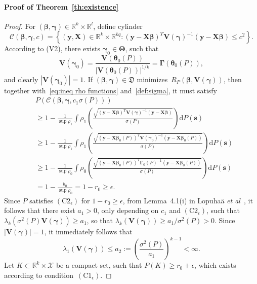 \documentclass{article}
\numberwithin{equation}{section}
\theoremstyle{plain}
\newcommand{\R}{\mathbb{R}}
\newcommand{\bbeta}{\bm\beta}
\newcommand{\btheta}{\bm\theta}
\newcommand{\bgamma}{\bm\gamma}
\newcommand{\bGamma}{\bm\Gamma}
\newcommand{\bTheta}{\bm\Theta}
\newcommand{\by}{\mathbf{y}}
\newcommand{\bs}{\mathbf{s}}
\newcommand{\bX}{\mathbf{X}}
\newcommand{\bV}{\mathbf{V}}
\begin{document}
\paragraph*{Proof of Theorem~\ref{th:existence}}
\begin{proof}
For $(\bbeta,\bgamma)\in\R^k\times\R^l$,
define cylinder
\begin{equation}
\label{def:cylinder gamma}
\mathcal{C}(\bbeta,\bgamma,c)=
\left\{
(\by,\bX)\in\R^k\times\R^{kq}:
(\by-\bX\bbeta)^T
\bV(\bgamma)^{-1}
(\by-\bX\bbeta)
\leq
c^2
\right\}.
\end{equation}
According to (V2), there exists $\bgamma_0\in\bTheta$, such that
\[
\bV(\bgamma_0)=\frac{\bV(\btheta_0(P))}{|\bV(\btheta_0(P))|^{1/k}}=\bGamma(\btheta_0(P)),
\]
and clearly $|\bV(\bgamma_0)|=1$.
If $(\bbeta,\bgamma)\in \mathfrak{D}$ minimizes~$R_P(\bbeta,\bV(\bgamma))$, then together with~\eqref{eq:ineq rho functions}
and~\eqref{def:sigma},
it must satisfy
\begin{equation}
\label{eq:lower bound prob cylinder}
\begin{split}
&
P\left(
\mathcal{C}\left(\bbeta,\bgamma,c_1\sigma(P)\right)
\right)\\
&\geq
1-\frac{1}{\sup\rho_1}
\int
\rho_1\left(
\frac{\displaystyle\sqrt{(\by-\bX\bbeta)^T\bV(\bgamma)^{-1}(\by-\bX\bbeta)}}{\sigma(P)}
\right)
\text{d}P(\bs)\\
&\geq
1-\frac{1}{\sup\rho_1}
\int
\rho_1\left(
\frac{\displaystyle\sqrt{(\by-\bX\bbeta_0(P))^T\bV(\bgamma_0)^{-1}(\by-\bX\bbeta_0(P))}}{\sigma(P)}
\right)
\text{d}P(\bs)\\
&\geq
1-\frac{1}{\sup\rho_0}
\int
\rho_0
\left(
\frac{\displaystyle\sqrt{(\by-\bX\bbeta_0(P))^T\bGamma_0(P)^{-1}(\by-\bX\bbeta_0(P))}}{\sigma(P)}
\right)
\text{d}P(\bs)\\
&=
1-\frac{b_0}{\sup\rho_0}
=
1-r_0
\geq
\epsilon.
\end{split}
\end{equation}
Since $P$ satisfies $(\text{C2}_\epsilon)$ for $1-r_0\geq \epsilon$, 
from Lemma~4.1(i) in Lopuha\"a \textit{et al}~\cite{lopuhaa-gares-ruizgazen2023}, 
it follows that there exist $a_1>0$, only depending on $c_1$ and $(\mathrm{C2}_{\epsilon})$, 
such that~$\lambda_k(\sigma^2(P)\bV(\bgamma))\geq a_1$, so that $\lambda_k(\bV(\bgamma))\geq a_1/\sigma^2(P)>0$.
Since $|\bV(\bgamma)|=1$, it immediately follows that
\[
\lambda_1(\bV(\bgamma))
\leq
a_2:=\left(\frac{\sigma^2(P)}{a_1}\right)^{k-1}<\infty.
\]
Let $K\subset\R^{k}\times \mathcal{X}$ be a compact set, such that $P(K)\geq r_0+\epsilon$, which exists according to condition~$(\mathrm{C1}_{\epsilon})$.

\end{proof}
\end{document}

